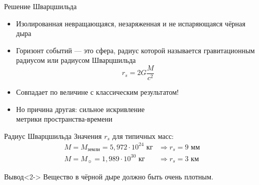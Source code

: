 \documentclass[usenames,dvipsnames,pdftex,unicode,hidelinks]{beamer}
\begin{document}
  \begin{frame}{Решение Шварцшильда}
    \begin{itemize}[<+->]
      \item Изолированная невращающаяся, незаряженная и не испаряющаяся чёрная дыра
      \item Горизонт событий — это сфера, радиус которой называется гравитационным радиусом или радиусом Шварцшильда
      \[
        \boxed{
          r_s = 2G\frac{M}{c^2}
        }
      \]
      \item \alert{Совпадает} по величине с классическим результатом!
      \item Но причина другая: сильное искривление\\ метрики пространства-времени
    \end{itemize}
    \vfill
  \end{frame}

  \begin{frame}{Радиус Шварцшильда}
    Значения $r_s$ для типичных масс:
    \begin{eqnarray*}
      M = M_{\text{земли}} = 5,972\cdot 10^{24} \text{ кг} & \Rightarrow r_s = 9 \text{ мм} \\
      M = M_{\sun} = 1,989\cdot 10^{30} \text{ кг} & \Rightarrow r_s = 3 \text{ км}
    \end{eqnarray*}
    \begin{block}{Вывод}<2->
      Вещество в чёрной дыре должно быть \alert{очень плотным}.
    \end{block}
  \end{frame}
\end{document}
